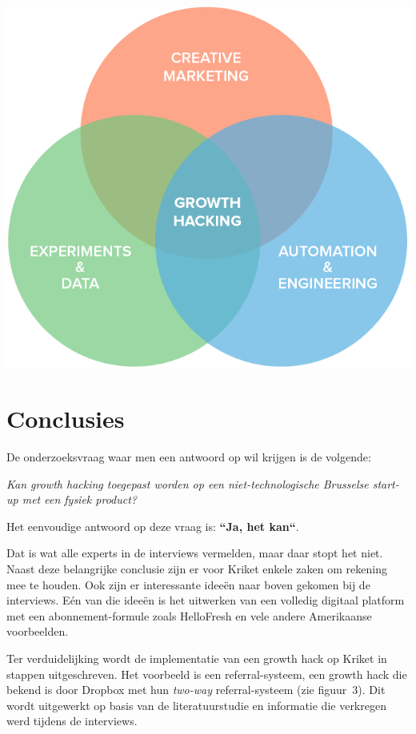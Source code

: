 \documentclass[a0,portrait]{a0poster}
\begin{document}
\begin{multicols}{2}
\begin{center}
\includegraphics[width=0.9\linewidth]{growth-hacking-essential-parts}

\end{center}\vspace{1cm}




\color{HoGentAccent1} 
\section*{Conclusies}
\color{black}
De onderzoeksvraag waar men een antwoord op wil krijgen is de volgende:

\emph{Kan growth hacking toegepast worden op een niet-technologische Brusselse start-up met een fysiek product?}

Het eenvoudige antwoord op deze vraag is: \textbf{``Ja, het kan``}.

Dat is wat alle experts in de interviews vermelden, maar daar stopt het niet. Naast deze belangrijke conclusie zijn er voor Kriket enkele zaken om rekening mee te houden. Ook zijn er interessante ideeën naar boven gekomen bij de interviews. Eén van die ideeën is het uitwerken van een volledig digitaal platform met een abonnement-formule zoals HelloFresh en vele andere Amerikaanse voorbeelden. 

Ter verduidelijking wordt de implementatie van een growth hack op Kriket in stappen uitgeschreven. Het voorbeeld is een referral-systeem, een growth hack die bekend is door Dropbox met hun \emph{two-way} referral-systeem (zie figuur~3). Dit wordt uitgewerkt op basis van de literatuurstudie en informatie die verkregen werd tijdens de interviews. 


\end{multicols}
\end{document}
